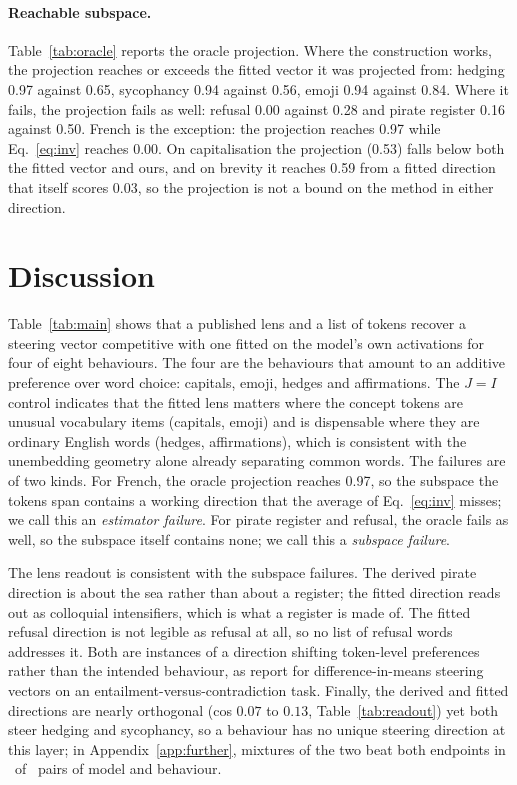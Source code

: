 \documentclass{article}
\begin{document}
\paragraph{Reachable subspace.}
Table~\ref{tab:oracle} reports the oracle projection. Where the construction works, the projection reaches or exceeds the fitted vector it was projected from: hedging 0.97 against 0.65, sycophancy 0.94 against 0.56, emoji 0.94 against 0.84. Where it fails, the projection fails as well: refusal 0.00 against 0.28 and pirate register 0.16 against 0.50. French is the exception: the projection reaches 0.97 while Eq.~\ref{eq:inv} reaches 0.00. On capitalisation the projection (0.53) falls below both the fitted vector and ours, and on brevity it reaches 0.59 from a fitted direction that itself scores 0.03, so the projection is not a bound on the method in either direction.

\section{Discussion}
\label{sec:discussion}

Table~\ref{tab:main} shows that a published lens and a list of tokens recover a steering vector competitive with one fitted on the model's own activations for four of eight behaviours. The four are the behaviours that amount to an additive preference over word choice: capitals, emoji, hedges and affirmations. The $J{=}I$ control indicates that the fitted lens matters where the concept tokens are unusual vocabulary items (capitals, emoji) and is dispensable where they are ordinary English words (hedges, affirmations), which is consistent with the unembedding geometry alone already separating common words. The failures are of two kinds. For French, the oracle projection reaches 0.97, so the subspace the tokens span contains a working direction that the average of Eq.~\ref{eq:inv} misses; we call this an \emph{estimator failure}. For pirate register and refusal, the oracle fails as well, so the subspace itself contains none; we call this a \emph{subspace failure}.

The lens readout is consistent with the subspace failures. The derived pirate direction is about the sea rather than about a register; the fitted direction reads out as colloquial intensifiers, which is what a register is made of. The fitted refusal direction is not legible as refusal at all, so no list of refusal words addresses it. Both are instances of a direction shifting token-level preferences rather than the intended behaviour, as \citet{yuan2026specificity} report for difference-in-means steering vectors on an entailment-versus-contradiction task. Finally, the derived and fitted directions are nearly orthogonal (cos $0.07$ to $0.13$, Table~\ref{tab:readout}) yet both steer hedging and sycophancy, so a behaviour has no unique steering direction at this layer; in Appendix~\ref{app:further}, mixtures of the two beat both endpoints in \FMixWins\ of \FMixCells\ pairs of model and behaviour.
\end{document}
